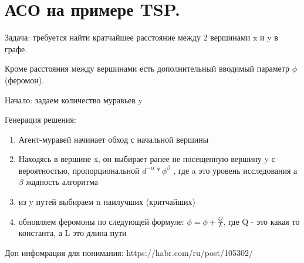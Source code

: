 \section{АСО на примере TSP.}
Задача: требуется найти кратчайшее расстояние между 2 вершинами x и y в графе.

Кроме расстояния между вершинами есть дополнительный вводимый параметр $\phi$ (феромон).

Начало: задаем количество муравьев y

Генерация решения:
\begin{enumerate} 
	\item Агент-муравей начинает обход с начальной вершины
	\item Находясь в вершине x, он выбирает ранее не посещенную вершину y с вероятностью, пропорциональной $d^{-\alpha} * \phi^\beta$ , где a это уровень исследования а $\beta$ жадность алгоритма
	\item из y путей выбираем n наилучших (критчайших)
	\item обновляем феромоны по следующей формуле: $\phi = \phi +  \frac{Q}{L}$, где Q - это какая то константа, а L это длина пути
\end{enumerate}
Доп инфомрация для понимания: https://habr.com/ru/post/105302/

